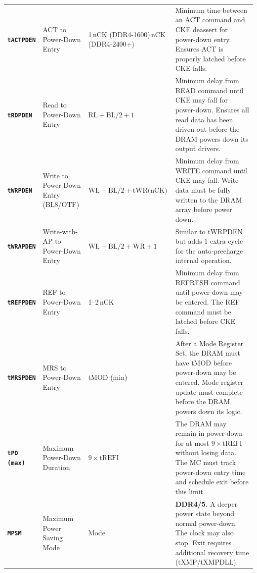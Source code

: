 \documentclass[11pt,a4paper]{article}
\newcommand{\sym}[1]{\texttt{\textbf{#1}}}
\begin{document}
\begin{longtable}{L{2.2cm} L{4.8cm} L{3.5cm} L{4cm}}
\sym{tACTPDEN} & ACT to Power-Down Entry & 1\,nCK (DDR4-1600)\,nCK (DDR4-2400+) &
  Minimum time between an ACT command and CKE deassert for power-down entry.
  Ensures ACT is properly latched before CKE falls. \\

\sym{tRDPDEN} & Read to Power-Down Entry & $\text{RL} + \text{BL/2} + 1$ &
  Minimum delay from READ command until CKE may fall for power-down.
  Ensures all read data has been driven out before the DRAM powers down its output drivers. \\

\sym{tWRPDEN} & Write to Power-Down Entry (BL8/OTF) & $\text{WL} + \text{BL/2} + \text{tWR(nCK)}$ &
  Minimum delay from WRITE command until CKE may fall.
  Write data must be fully written to the DRAM array before power down. \\

\sym{tWRAPDEN} & Write-with-AP to Power-Down Entry & $\text{WL} + \text{BL/2} + \text{WR} + 1$ &
  Similar to tWRPDEN but adds 1 extra cycle for the auto-precharge internal operation. \\

\sym{tREFPDEN} & REF to Power-Down Entry & 1--2\,nCK &
  Minimum delay from REFRESH command until power-down may be entered.
  The REF command must be latched before CKE falls. \\

\sym{tMRSPDEN} & MRS to Power-Down Entry & tMOD (min) &
  After a Mode Register Set, the DRAM must have tMOD before power-down may be entered.
  Mode register update must complete before the DRAM powers down its logic. \\

\sym{tPD\,(max)} & Maximum Power-Down Duration & $9 \times \text{tREFI}$ &
  The DRAM may remain in power-down for at most $9 \times \text{tREFI}$ without losing data.
  The MC must track power-down entry time and schedule exit before this limit. \\

\sym{MPSM} & Maximum Power Saving Mode & Mode &
  \textbf{DDR4/5.} A deeper power state beyond normal power-down. The clock may also stop.
  Exit requires additional recovery time (tXMP/tXMPDLL). \\
\end{longtable}

\end{document}
